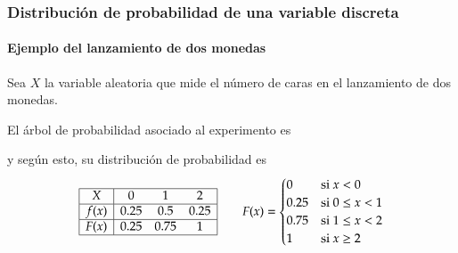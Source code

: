 \begin{frame}
\frametitle{Distribución de probabilidad de una variable discreta}
\framesubtitle{Ejemplo del lanzamiento de dos monedas}
Sea $X$ la variable aleatoria que mide el número de caras en el lanzamiento de dos monedas. 


El árbol de probabilidad asociado al experimento es 
\begin{center}
\end{center}
y según esto, su distribución de probabilidad es
\[
\begin{array}{|c|ccc|}
\hline
X & 0 & 1 & 2\\ \hline
f(x) & 0.25 & 0.5 & 0.25\\
\hline
F(x) & 0.25 & 0.75 & 1 \\
\hline 
\end{array}
\qquad
F(x) =
\begin{cases}
0 & \mbox{si $x<0$}\\
0.25 & \mbox{si $0\leq x< 1$}\\
0.75 & \mbox{si $1\leq x< 2$}\\
1 & \mbox{si $x\geq 2$}
\end{cases}
\]
\end{frame}


